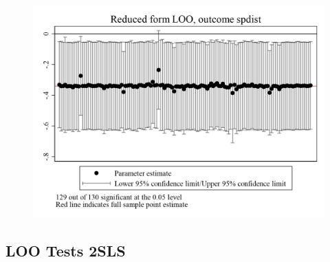 \documentclass{article}
\begin{document}
\clearpage
\begin{figure}
	\centering
	\includegraphics[width=.8\textwidth]{figures/exogeneity_tests/loo_rf_spdist.png}
\end{figure}
\clearpage
\subsection{LOO Tests 2SLS}
\clearpage
\end{document}
